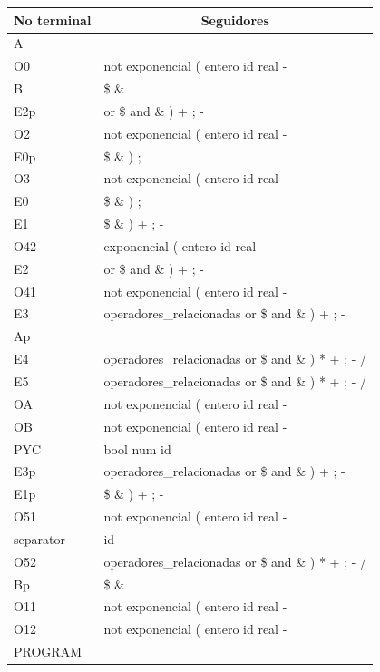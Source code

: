 \documentclass{article}
\begin{document}
\begin{tabular}{|l|l|}
	\hline
	\multicolumn{1}{|c|}{No terminal} & \multicolumn{1}{c|}{Seguidores} \\ \hline
A	 & 	\\ \hline
O0	 & 	not exponencial ( entero id real -\\ \hline
B	 & 	\$ \&\\ \hline
E2p	 & 	or \$ and \& ) + ; -\\ \hline
O2	 & 	not exponencial ( entero id real -\\ \hline
E0p	 & 	\$ \& ) ;\\ \hline
O3	 & 	not exponencial ( entero id real -\\ \hline
E0	 & 	\$ \& ) ;\\ \hline
E1	 & 	\$ \& ) + ; -\\ \hline
O42	 & 	exponencial ( entero id real\\ \hline
E2	 & 	or \$ and \& ) + ; -\\ \hline
O41	 & 	not exponencial ( entero id real -\\ \hline
E3	 & 	operadores\_relacionadas or \$ and \& ) + ; -\\ \hline
Ap	 & 	\\ \hline
E4	 & 	operadores\_relacionadas or \$ and \& ) * + ; - /\\ \hline
E5	 & 	operadores\_relacionadas or \$ and \& ) * + ; - /\\ \hline
OA	 & 	not exponencial ( entero id real -\\ \hline
OB	 & 	not exponencial ( entero id real -\\ \hline
PYC	 & 	bool num id\\ \hline
E3p	 & 	operadores\_relacionadas or \$ and \& ) + ; -\\ \hline
E1p	 & 	\$ \& ) + ; -\\ \hline
O51	 & 	not exponencial ( entero id real -\\ \hline
separator	 & 	id\\ \hline
O52	 & 	operadores\_relacionadas or \$ and \& ) * + ; - /\\ \hline
Bp	 & 	\$ \&\\ \hline
O11	 & 	not exponencial ( entero id real -\\ \hline
O12	 & 	not exponencial ( entero id real -\\ \hline
PROGRAM	 & \\ \hline
\end{tabular}
\end{document}
